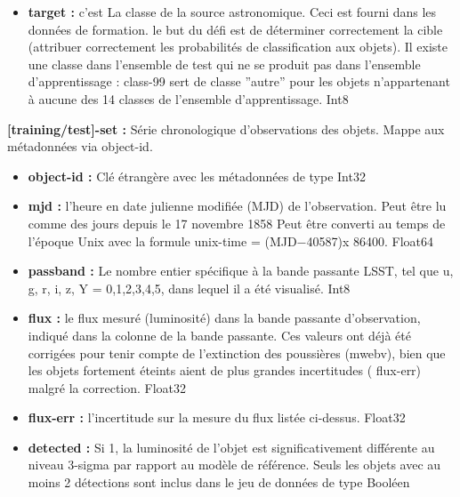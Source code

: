 \begin{itemize}
    \item\textbf{target :} c’est La classe de la source astronomique. Ceci est fourni dans les données de formation. le but du défi est de déterminer correctement la cible (attribuer correctement les probabilités de classification aux objets). Il existe une classe dans l’ensemble de test qui ne se produit pas dans l’ensemble d’apprentissage : class-99 sert de classe ”autre” pour les objets n’appartenant à aucune des 14 classes de l’ensemble d’apprentissage. Int8
    \end{itemize}


\newline
\textbf{[training/test]-set :} Série chronologique d’observations des objets. Mappe aux métadonnées via object-id.
\begin{itemize}
    \item \textbf{object-id :} Clé étrangère avec les métadonnées de type Int32
    \item \textbf{ mjd :} l’heure en date julienne modifiée (MJD) de l’observation. Peut être lu comme des jours depuis le 17 novembre 1858 Peut être converti au temps de l’époque Unix avec la formule unix-time = (MJD−40587)x 86400. Float64
    \item \textbf{passband :} Le nombre entier spécifique à la bande passante LSST, tel que u, g, r, i, z, Y = 0,1,2,3,4,5, dans lequel il a été visualisé. Int8
    \item \textbf{flux :} le flux mesuré (luminosité) dans la bande passante d’observation, indiqué dans la colonne de la bande passante. Ces valeurs ont déjà été corrigées pour tenir compte de l’extinction des poussières (mwebv), bien que les objets fortement éteints aient de plus grandes incertitudes ( flux-err) malgré la correction. Float32
    \item \textbf{flux-err :} l’incertitude sur la mesure du flux listée ci-dessus. Float32
    \item \textbf{ detected :} Si 1, la luminosité de l’objet est significativement différente au niveau 3-sigma par rapport au modèle de référence. Seuls les objets avec au moins 2 détections sont inclus dans le jeu de données de type Booléen
\end{itemize}
\newline

